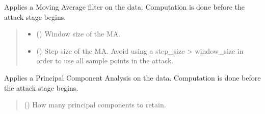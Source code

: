 \documentclass[letterpaper,10pt,english]{sphinxmanual}
\begin{document}
\begin{fulllineitems}
\begin{fulllineitems}
\label{\detokenize{MLSCAlib.Data:MLSCAlib.Data.custom_manager.CustomDataManager.apply_MA}}
\pysigstartsignatures
{}
\pysigstopsignatures
\sphinxAtStartPar
Applies a Moving Average filter on the data. Computation is done before the attack stage begins.
\begin{quote}\begin{description}
\begin{itemize}
\item {} 
\sphinxAtStartPar
{} (\sphinxstyleliteralemphasis{\sphinxupquote{, }}) \textendash{} Window size of the MA.

\item {} 
\sphinxAtStartPar
{} (\sphinxstyleliteralemphasis{\sphinxupquote{, }}) \textendash{} Step size of the MA. Avoid using a step\_size \textgreater{} window\_size in order to use all sample points in the
attack.

\end{itemize}

\end{description}\end{quote}

\end{fulllineitems}


\begin{fulllineitems}
\label{\detokenize{MLSCAlib.Data:MLSCAlib.Data.custom_manager.CustomDataManager.apply_PCA}}
\pysigstartsignatures
{}
\pysigstopsignatures
\sphinxAtStartPar
Applies a Principal Component Analysis on the data. Computation is done before the attack stage begins.
\begin{quote}\begin{description}
\sphinxAtStartPar
{} (\sphinxstyleliteralemphasis{\sphinxupquote{, }}) \textendash{} How many principal components to retain.


\end{description}
\end{quote}
\end{fulllineitems}
\end{fulllineitems}
\end{document}
